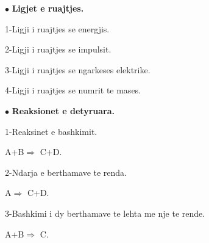 \documentclass[twocolumn]{article}
\begin{document}
$\bullet$ \textbf{Ligjet e ruajtjes.}

1-Ligji i ruajtjes se energjis.

2-Ligji i ruajtjes se impulsit.

3-Ligji i ruajtjes se ngarkeses elektrike.

4-Ligji i ruajtjes se numrit te mases.




$\bullet$ \textbf{Reaksionet e detyruara.}

1-Reaksinet e bashkimit.

A+B$\Rightarrow$ C+D.

2-Ndarja e berthamave te renda.

A$\Rightarrow$ C+D.

3-Bashkimi i dy berthamave te lehta me nje te rende.

A+B$\Rightarrow$ C.
\end{document}
